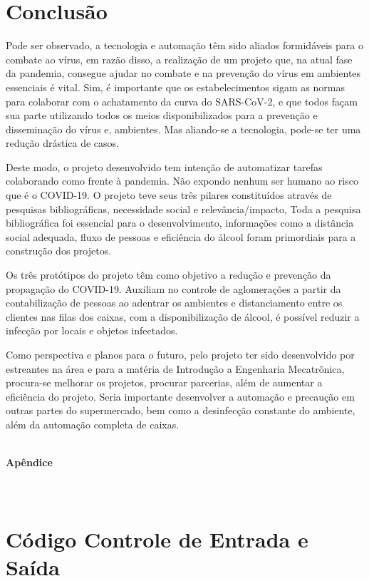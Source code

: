 \documentclass[10pt,twocolumn,letterpaper]{article}
\begin{document}
\section{Conclusão}

Pode ser observado, a tecnologia e automação têm sido aliados formidáveis para o combate ao vírus, em razão disso,  a realização de um projeto que, na atual fase da pandemia, consegue ajudar no combate e na prevenção do vírus em ambientes essenciais é vital.
Sim, é importante que os estabelecimentos sigam as normas para colaborar com o achatamento da curva do SARS-CoV-2, e que todos façam sua parte utilizando todos os meios disponibilizados para a prevenção e disseminação do vírus e, ambientes. Mas aliando-se a tecnologia, pode-se ter uma redução drástica de casos.

Deste modo, o projeto desenvolvido tem intenção de automatizar tarefas colaborando como frente à pandemia. Não expondo nenhum ser humano ao risco que é o COVID-19. 
O projeto teve seus três pilares constituídos através de pesquisas bibliográficas, necessidade social e relevância/impacto, Toda a pesquisa bibliográfica foi essencial para o desenvolvimento, informações como a distância social adequada, fluxo de pessoas e eficiência do álcool foram primordiais para a construção dos projetos.

Os três protótipos do projeto têm como objetivo a redução e prevenção da propagação do COVID-19. Auxiliam no controle de aglomerações a partir da contabilização de pessoas ao adentrar os ambientes e distanciamento entre os clientes nas filas dos caixas, com a disponibilização de álcool, é possível reduzir a infecção por locais e objetos infectados.

Como perspectiva e planos para o futuro, pelo projeto ter sido desenvolvido por estreantes na área e para a matéria de Introdução a Engenharia Mecatrônica, procura-se melhorar os projetos, procurar parcerias, além de aumentar a eficiência do projeto. Seria importante desenvolver a automação e precaução em outras partes do supermercado, bem como a desinfecção constante do ambiente, além da automação completa de caixas.

{\small


}

\clearpage
\Large
\textbf{\\Apêndice}

\appendix

\section{\\Código Controle de Entrada e Saída}
\end{document}
